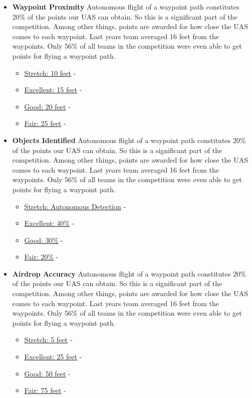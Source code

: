 \documentclass[]{auvsi_doc}
\begin{document}
\begin{itemize}
\item \textbf{Waypoint Proximity} Autonomous flight of a waypoint path constitutes 20\% of the points our UAS can obtain. So this is a significant part of the competition. Among other things, points are awarded for how close the UAS comes to each waypoint. Last years team averaged 16 feet from the waypoints. Only 56\% of all teams in the competition were even able to get points for flying a waypoint path.
	\begin{itemize}
	\item \underline{Stretch: 10 feet} - 
	\item \underline{Excellent: 15 feet} -  
	\item \underline{Good: 20 feet} -  
	\item  \underline{Fair: 25 feet} -  
	\end{itemize}
\item \textbf{Objects Identified} Autonomous flight of a waypoint path constitutes 20\% of the points our UAS can obtain. So this is a significant part of the competition. Among other things, points are awarded for how close the UAS comes to each waypoint. Last years team averaged 16 feet from the waypoints. Only 56\% of all teams in the competition were even able to get points for flying a waypoint path.
	\begin{itemize}
	\item \underline{Stretch: Autonomous Detection} - 
	\item \underline{Excellent: 40\%} -  
	\item \underline{Good: 30\%} -  
	\item  \underline{Fair: 20\%} -  
	\end{itemize}
\item \textbf{Airdrop Accuracy} Autonomous flight of a waypoint path constitutes 20\% of the points our UAS can obtain. So this is a significant part of the competition. Among other things, points are awarded for how close the UAS comes to each waypoint. Last years team averaged 16 feet from the waypoints. Only 56\% of all teams in the competition were even able to get points for flying a waypoint path.
	\begin{itemize}
	\item \underline{Stretch: 5 feet} - 
	\item \underline{Excellent: 25 feet} -  
	\item \underline{Good: 50 feet} -  
	\item  \underline{Fair: 75 feet} -  
	\end{itemize}

\end{itemize}
\end{document}
